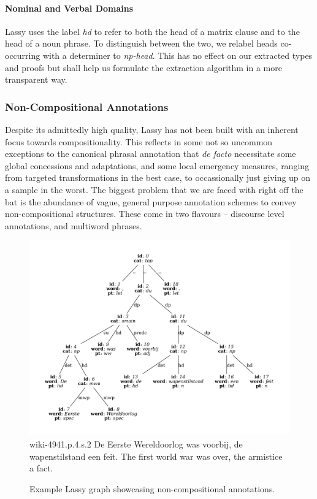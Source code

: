 \paragraph{Nominal and Verbal Domains}
Lassy uses the label \textit{hd} to refer to both the head of a matrix clause and to the head of a noun phrase.
To distinguish between the two, we relabel heads co-occurring with a determiner to \textit{np-head}.
This has no effect on our extracted types and proofs but shall help us formulate the extraction algorithm in a more transparent way.

\subsubsection{Non-Compositional Annotations}
Despite its admittedly high quality, Lassy has not been built with an inherent focus towards compositionality.
This reflects in some not so uncommon exceptions to the canonical phrasal annotation that \textit{de facto} necessitate some global concessions and adaptations, and some local emergency measures, ranging from targeted transformations in the best case, to occassionally just giving up on a sample in the worst.
The biggest problem that we are faced with right off the bat is the abundance of vague, general purpose annotation schemes to convey non-compositional structures.
These come in two flavours -- discourse level annotations, and multiword phrases.

\begin{figure}
	\includegraphics[width=1\textwidth,trim={1.25cm 0 1.25cm 0}, clip]{./prebuilt/du_mwp_example.pdf}
	\lassycap
		{wiki-4941.p.4.s.2}
		{De Eerste Wereldoorlog was voorbij, de wapenstilstand een feit.}
		{The first world war was over, the armistice a fact.}
	\caption{Example Lassy graph showcasing non-compositional annotations.}
	\label{figure:du_mwp_example}
\end{figure}

